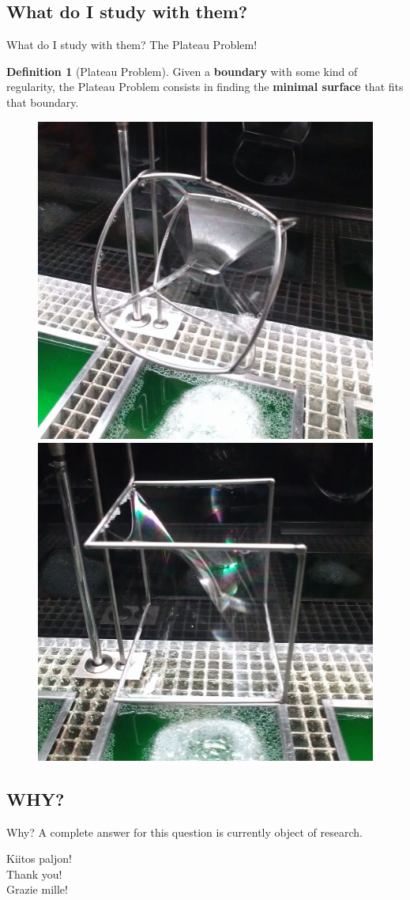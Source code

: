 \documentclass[serif]{beamer}
\theoremstyle{definition}
\newtheorem*{defin}{Definition}
\begin{document}
\subsection{What do I study with them?}
\begin{frame}{What do I study with them? The Plateau Problem!}
\begin{defin}[Plateau Problem]
Given a \textbf{boundary} with some kind of regularity, the Plateau Problem consists in finding the \textbf{minimal surface} that fits that boundary.
\end{defin}
\begin{figure}[!ht]
\centering
{\includegraphics[width=4.5 cm]{Plateau_problem_01.jpg}}
{\includegraphics[width=4.5 cm]{Plateau_problem_02.jpg}}
\end{figure}
\end{frame}


\subsection{WHY?}
\begin{frame}{Why?}
A complete answer for this question is currently object of research.
\end{frame}


\begin{frame}
\begin{center}
\huge{Kiitos paljon!}\\
\huge{Thank you!}\\
\huge{Grazie mille!}
\end{center}
\end{frame}
\end{document}
